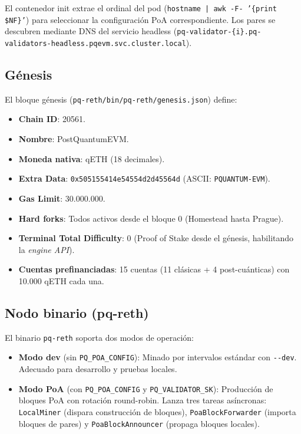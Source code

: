 El contenedor init extrae el ordinal del pod (\texttt{hostname | awk -F- '\{print \$NF\}'}) para seleccionar la configuración PoA correspondiente. Los pares se descubren mediante DNS del servicio headless (\texttt{pq-validator-\{i\}.pq-validators-headless.pqevm.svc.cluster.local}).

\subsection{Génesis}

El bloque génesis (\texttt{pq-reth/bin/pq-reth/genesis.json}) define:

\begin{itemize}
  \item \textbf{Chain ID}: 20561.
  \item \textbf{Nombre}: PostQuantumEVM.
  \item \textbf{Moneda nativa}: qETH (18 decimales).
  \item \textbf{Extra Data}: \texttt{0x505155414e54554d2d45564d} (ASCII: \texttt{PQUANTUM-EVM}).
  \item \textbf{Gas Limit}: 30.000.000.
  \item \textbf{Hard forks}: Todos activos desde el bloque 0 (Homestead hasta Prague).
  \item \textbf{Terminal Total Difficulty}: 0 (Proof of Stake desde el génesis, habilitando la \emph{engine API}).
  \item \textbf{Cuentas prefinanciadas}: 15 cuentas (11 clásicas + 4 post-cuánticas) con 10.000 qETH cada una.
\end{itemize}

\subsection{Nodo binario (pq-reth)}

El binario \texttt{pq-reth} soporta dos modos de operación:

\begin{itemize}
  \item \textbf{Modo dev} (sin \texttt{PQ\_POA\_CONFIG}): Minado por intervalos estándar con \texttt{-{}-dev}. Adecuado para desarrollo y pruebas locales.
  \item \textbf{Modo PoA} (con \texttt{PQ\_POA\_CONFIG} y \texttt{PQ\_VALIDATOR\_SK}): Producción de bloques PoA con rotación round-robin. Lanza tres tareas asíncronas: \texttt{Local\-Miner} (dispara construcción de bloques), \texttt{Poa\-Block\-Forwarder} (importa bloques de pares) y \texttt{Poa\-Block\-Announcer} (propaga bloques locales).
\end{itemize}


